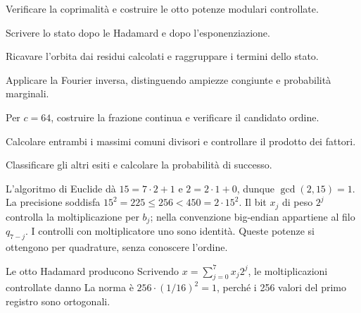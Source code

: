 \begin{ExTasks}\setlength{\itemsep}{0pt}

\item Verificare la coprimalità e costruire le otto potenze modulari controllate.

\item Scrivere lo stato dopo le Hadamard e dopo l’esponenziazione.

\item Ricavare l’orbita dai residui calcolati e raggruppare i termini dello stato.

\item Applicare la Fourier inversa, distinguendo ampiezze congiunte e probabilità marginali.

\item Per \(c=64\), costruire la frazione continua e verificare il candidato ordine.

\item Calcolare entrambi i massimi comuni divisori e controllare il prodotto dei fattori.

\item Classificare gli altri esiti e calcolare la probabilità di successo.

\end{ExTasks}

\ExSolution


L’algoritmo di Euclide dà \(15=7\cdot2+1\) e \(2=2\cdot1+0\), dunque \(\gcd(2,15)=1\). La precisione soddisfa \(15^2=225\leq256<450=2\cdot15^2\).
Il bit \(x_j\) di peso \(2^j\) controlla la moltiplicazione per \(b_j\); nella convenzione big-endian appartiene al filo \(q_{7-j}\). I controlli con moltiplicatore uno sono identità. Queste potenze si ottengono per quadrature, senza conoscere l’ordine.


Le otto Hadamard producono
Scrivendo \(x=\sum_{j=0}^{7}x_j2^j\), le moltiplicazioni controllate danno
La norma è \(256\cdot(1/16)^2=1\), perché i 256 valori del primo registro sono ortogonali.

